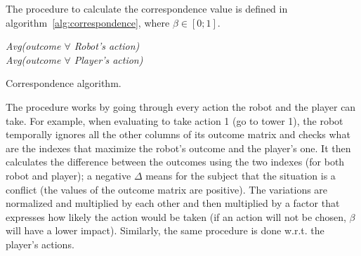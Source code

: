 The procedure to calculate the correspondence value is defined in algorithm~\ref{alg:correspondence}, where $\beta \in[0;1]$.
\begin{algorithm}[h]
\SetAlgoLined
{}
\BlankLine
\textit{Avg(outcome $\forall$ Robot's action)}\\
\textit{Avg(outcome $\forall$ Player's action)}\\

\caption{Correspondence algorithm.}
\label{alg:correspondence}
\end{algorithm}
The procedure works by going through every action the robot and the player can take. For example, when evaluating to take action 1 (go to tower 1), the robot temporally ignores all the other columns of its outcome matrix and checks what are the indexes that maximize the robot's outcome and the player's one. It then calculates the difference between the outcomes using the two indexes (for both robot and player); a negative $\Delta$ means for the subject that the situation is a conflict (the values of the outcome matrix are positive). The variations are normalized and multiplied by each other and then multiplied by a factor that expresses how likely the action would be taken (if an action will not be chosen, $\beta$ will have a lower impact). Similarly, the same procedure is done w.r.t. the player's actions.

